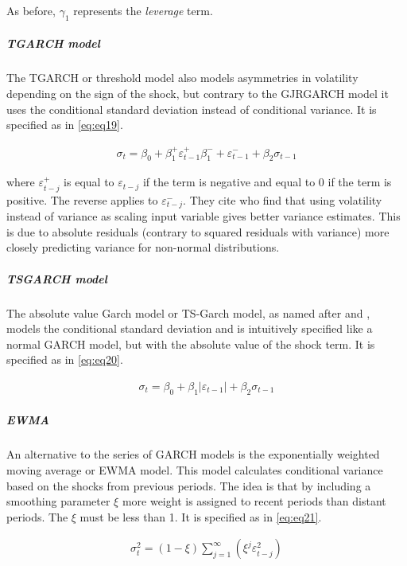 \documentclass[a4paper, twoside]{templates/ociamthesis}
\begin{document}
As before, \(\gamma_1\) represents the \emph{leverage} term.

\hypertarget{tgarch-model}{%
\subparagraph{TGARCH model}\label{tgarch-model}}

\noindent The TGARCH or threshold model \autocite{zakoian1994} also models asymmetries in volatility depending on the sign of the shock, but contrary to the GJRGARCH model it uses the conditional standard deviation instead of conditional variance. It is specified as in \eqref{eq:eq19}.

\begin{align}
\sigma_t = \beta_0 + \beta_1^+ \varepsilon_{t-1}^+ \beta_1^{-} + \varepsilon_{t-1}^{-} + \beta_2 \sigma_{t-1}
 \label{eq:eq19}
\end{align}

\noindent where \(\varepsilon_{t-j}^+\) is equal to \(\varepsilon_{t-j}\) if the term is negative and equal to 0 if the term is positive. The reverse applies to \(\varepsilon_{t-j}^-\). They cite \textcite{davidian1987} who find that using volatility instead of variance as scaling input variable gives better variance estimates. This is due to absolute residuals (contrary to squared residuals with variance) more closely predicting variance for non-normal distributions.

\hypertarget{tsgarch-model}{%
\subparagraph{TSGARCH model}\label{tsgarch-model}}

\noindent The absolute value Garch model or TS-Garch model, as named after \textcite{taylor1986} and \textcite{schwert1989}, models the conditional standard deviation and is intuitively specified like a normal GARCH model, but with the absolute value of the shock term. It is specified as in \eqref{eq:eq20}.

\begin{align}
\sigma_t = \beta_0 + \beta_1 \left|\varepsilon_{t-1}\right| + \beta_2 \sigma_{t-1}
 \label{eq:eq20}
\end{align}

\hypertarget{ewma}{%
\subparagraph{EWMA}\label{ewma}}

\noindent An alternative to the series of GARCH models is the exponentially weighted moving average or EWMA model. This model calculates conditional variance based on the shocks from previous periods. The idea is that by including a smoothing parameter \(\xi\) more weight is assigned to recent periods than distant periods. The \(\xi\) must be less than 1. It is specified as in \eqref{eq:eq21}.

\begin{align}
\sigma_t^2 = (1-\xi) \sum\limits_{j=1}^\infty (\xi^j \varepsilon_{t-j}^2)
 \label{eq:eq21}
\end{align}
\end{document}
